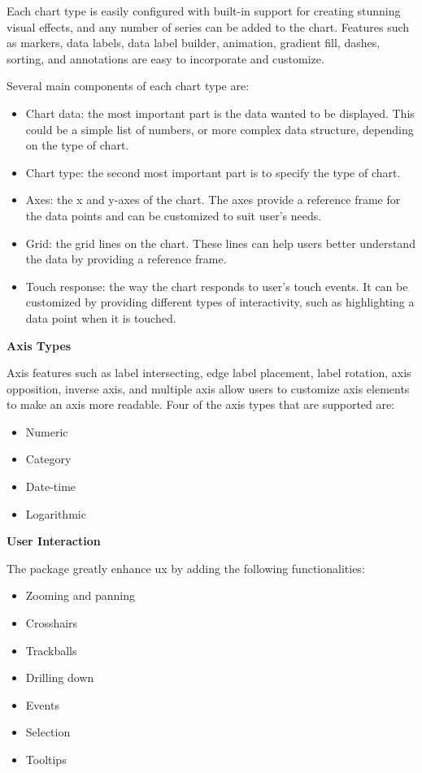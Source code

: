 \begin{multicols}{2}
      Each chart type is easily configured with built-in support for creating stunning visual effects, and any number of series can
      be added to the chart. Features such as markers, data labels, data label builder, animation, gradient fill, dashes, sorting,
      and annotations are easy to incorporate and customize.

      Several main components of each chart type are:
      \begin{itemize}
            \item Chart data: the most important part is the data wanted to be displayed. This could be a simple list of numbers, or
                  more complex data structure, depending on the type of chart.
            \item Chart type: the second most important part is to specify the type of chart.
            \item Axes: the x and y-axes of the chart. The axes provide a reference frame for the data points and can be customized
                  to suit user's needs.
            \item Grid: the grid lines on the chart. These lines can help users better understand the data by providing a reference
                  frame.
            \item Touch response: the way the chart responds to user's touch events. It can be customized by providing different types
                  of interactivity, such as highlighting a data point when it is touched.
      \end{itemize}

      \textbf{Axis Types}

      Axis features such as label intersecting, edge label placement, label rotation, axis opposition, inverse axis, and multiple axis
      allow users to customize axis elements to make an axis more readable. Four of the axis types that are supported are:
      \begin{itemize}
            \item Numeric
            \item Category
            \item Date-time
            \item Logarithmic
      \end{itemize}

      \textbf{User Interaction}

      The package greatly enhance \acrshort{ux} by adding the following functionalities:
      \begin{itemize}
            \item Zooming and panning
            \item Crosshairs
            \item Trackballs
            \item Drilling down
            \item Events
            \item Selection
            \item Tooltips
      \end{itemize}


\end{multicols}
